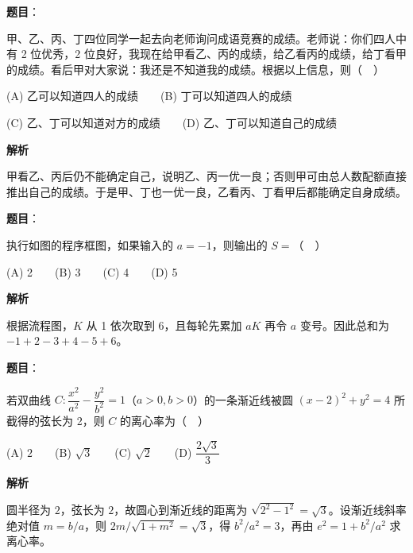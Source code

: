 \begin{answer}

\textbf{题目}：

甲、乙、丙、丁四位同学一起去向老师询问成语竞赛的成绩。老师说：你们四人中有 2 位优秀，2 位良好，我现在给甲看乙、丙的成绩，给乙看丙的成绩，给丁看甲的成绩。看后甲对大家说：我还是不知道我的成绩。根据以上信息，则（　）

   (A) 乙可以知道四人的成绩　　(B) 丁可以知道四人的成绩

   (C) 乙、丁可以知道对方的成绩　　(D) 乙、丁可以知道自己的成绩

\textbf{解析}

甲看乙、丙后仍不能确定自己，说明乙、丙一优一良；否则甲可由总人数配额直接推出自己的成绩。于是甲、丁也一优一良，乙看丙、丁看甲后都能确定自身成绩。


\end{answer}
\begin{answer}

\textbf{题目}：

执行如图的程序框图，如果输入的 \(a=-1\)，则输出的 \(S=\)（　）
\nopagebreak[4]
\begin{center}\end{center}
\nopagebreak[4]
   (A) 2　　(B) 3　　(C) 4　　(D) 5

\textbf{解析}

根据流程图，\(K\) 从 1 依次取到 6，且每轮先累加 \(aK\) 再令 \(a\) 变号。因此总和为 \(-1+2-3+4-5+6\)。


\end{answer}
\begin{answer}

\textbf{题目}：

若双曲线 \(C:\dfrac{x^2}{a^2}-\dfrac{y^2}{b^2}=1\)（\(a>0,b>0\)）的一条渐近线被圆 \((x-2)^2+y^2=4\) 所截得的弦长为 2，则 \(C\) 的离心率为（　）

   (A) \(2\)　　(B) \(\sqrt{3}\)　　(C) \(\sqrt{2}\)　　(D) \(\dfrac{2\sqrt{3}}{3}\)

\textbf{解析}

圆半径为 \(2\)，弦长为 \(2\)，故圆心到渐近线的距离为 \(\sqrt{2^2-1^2}=\sqrt3\)。设渐近线斜率绝对值 \(m=b/a\)，则 \(2m/\sqrt{1+m^2}=\sqrt3\)，得 \(b^2/a^2=3\)，再由 \(e^2=1+b^2/a^2\) 求离心率。


\end{answer}
